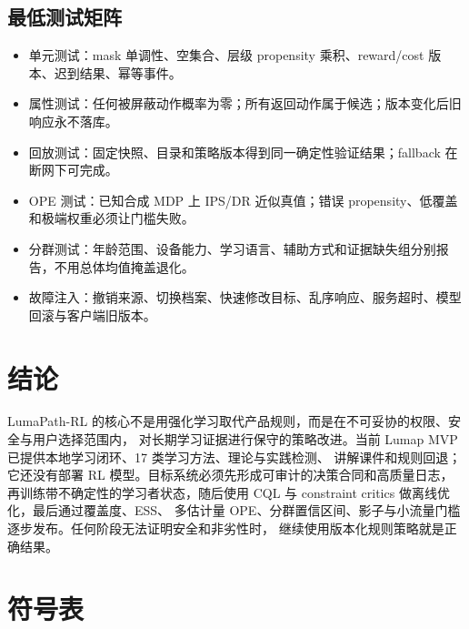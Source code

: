 \documentclass[11pt,a4paper,fontset=none]{ctexart}
\newcommand{\1}{\mathbb{I}}
\begin{document}
\subsection{最低测试矩阵}

\begin{itemize}
  \item 单元测试：mask 单调性、空集合、层级 propensity 乘积、reward/cost 版本、迟到结果、幂等事件。
  \item 属性测试：任何被屏蔽动作概率为零；所有返回动作属于候选；版本变化后旧响应永不落库。
  \item 回放测试：固定快照、目录和策略版本得到同一确定性验证结果；fallback 在断网下可完成。
  \item OPE 测试：已知合成 MDP 上 IPS/DR 近似真值；错误 propensity、低覆盖和极端权重必须让门槛失败。
  \item 分群测试：年龄范围、设备能力、学习语言、辅助方式和证据缺失组分别报告，不用总体均值掩盖退化。
  \item 故障注入：撤销来源、切换档案、快速修改目标、乱序响应、服务超时、模型回滚与客户端旧版本。
\end{itemize}

\section{结论}

LumaPath-RL 的核心不是用强化学习取代产品规则，而是在不可妥协的权限、安全与用户选择范围内，
对长期学习证据进行保守的策略改进。当前 Lumap MVP 已提供本地学习闭环、17 类学习方法、理论与实践检测、
讲解课件和规则回退；它还没有部署 RL 模型。目标系统必须先形成可审计的决策合同和高质量日志，
再训练带不确定性的学习者状态，随后使用 CQL 与 constraint critics 做离线优化，最后通过覆盖度、ESS、
多估计量 OPE、分群置信区间、影子与小流量门槛逐步发布。任何阶段无法证明安全和非劣性时，
继续使用版本化规则策略就是正确结果。

\appendix
\section{符号表}
\end{document}
